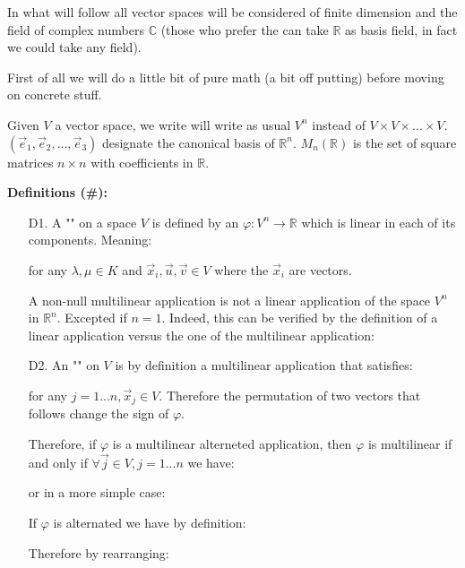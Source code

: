 	In what will follow all vector spaces will be considered of finite dimension and the field of complex numbers $\mathbb{C}$ (those who prefer the can take $\mathbb{R}$ as basis field, in fact we could take any field).
	
	First of all we will do a little bit of pure math (a bit off putting) before moving on  concrete stuff.
	
	Given $V$ a vector space, we write will write as usual $V^n$ instead of $V\times V\times... \times V$. $(\vec{e}_1,\vec{e}_2,...,\vec{e}_3)$ designate the canonical basis of $\mathbb{R}^n$. $M_n(\mathbb{R})$ is the set of square matrices $n\times n$ with coefficients in $\mathbb{R}$.
	
	\textbf{Definitions (\#\mydef):}
	\begin{enumerate}
		\item[D1.] A "" on a space $V$ is defined by an $\varphi: V^n \rightarrow \mathbb{R}$ which is linear in each of its components. Meaning:
		
		for any $\lambda,\mu\in K$ and $\vec{x}_i,\vec{u},\vec{v}\in V$ where the $\vec{x}_i$ are vectors.
		\begin{tcolorbox}[title=Remark,colframe=black,arc=10pt]
		A non-null multilinear application is not a linear application of the space $V^n$ in $\mathbb{R}^n$. Excepted if $n=1$. Indeed, this can be verified by the definition of a linear application  versus the one of the multilinear application:
		
		\end{tcolorbox}
		\item[D2.] An "" on $V$ is by definition a multilinear application that satisfies:
		
		for any $j=1...n,\vec{x}_j\in V$. Therefore the permutation of two vectors that follows change the sign of $\varphi$.
		\begin{theorem}
		Therefore, if $\varphi$ is a multilinear alterneted application, then $\varphi$ is multilinear if and only if $\forall \vec{j}\in V,j=1...n$ we have:
		
		or in a more simple case:
		
		\end{theorem}
		\begin{dem}
		If $\varphi$ is alternated we have by definition:
		
		Therefore by rearranging:
		

\end{dem}
\end{enumerate}
